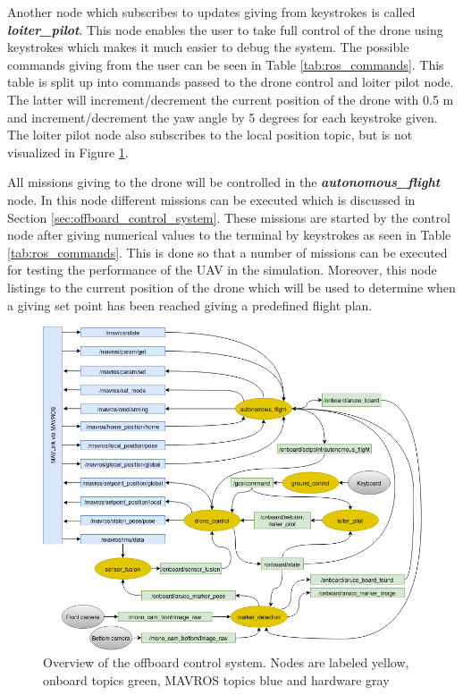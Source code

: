 \documentclass[../Head/report.tex]{subfiles}
\begin{document}
Another node which subscribes to updates giving from keystrokes is called  \textit{\textbf{loiter\_pilot}}. This node enables the user to take full control of the drone using keystrokes which makes it much easier to debug the system. The possible commands giving from the user can be seen in Table \ref{tab:ros_commands}. This table is split up into commands passed to the drone control and loiter pilot node. The latter will increment/decrement the current position of the drone with 0.5 m and increment/decrement the yaw angle by 5 degrees for each keystroke given. The loiter pilot node also subscribes to the local position topic, but is not visualized in Figure \ref{fig:offboard_control}.

All missions giving to the drone will be controlled in the \textit{\textbf{autonomous\_flight}} node. In this node different missions can be executed which is discussed in Section \ref{sec:offboard_control_system}. These missions are started by the control node after giving numerical values to the terminal by keystrokes as seen in Table  \ref{tab:ros_commands}. This is done so that a number of missions can be executed for testing the performance of the UAV in the simulation. Moreover, this node listings to the current position of the drone which will be used to determine when a giving set point has been reached giving a predefined flight plan. 

\begin{figure}[H]
    \centering
    \includegraphics[width=0.95\linewidth]{../Figures/node_communication.png}
    \caption{Overview of the offboard control system. Nodes are labeled yellow, onboard topics green, MAVROS topics blue and hardware gray}
    \label{fig:offboard_control}
\end{figure}
\end{document}
